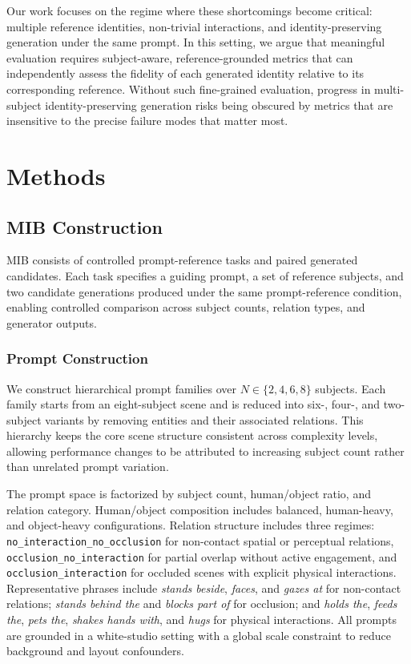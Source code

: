 \documentclass{article}
\begin{document}
Our work focuses on the regime where these shortcomings become critical: multiple reference identities, non-trivial interactions, and identity-preserving generation under the same prompt. In this setting, we argue that meaningful evaluation requires subject-aware, reference-grounded metrics that can independently assess the fidelity of each generated identity relative to its corresponding reference. Without such fine-grained evaluation, progress in multi-subject identity-preserving generation risks being obscured by metrics that are insensitive to the precise failure modes that matter most.

\section{Methods}

\subsection{MIB Construction}

MIB consists of controlled prompt-reference tasks and paired generated candidates. Each task specifies a guiding prompt, a set of reference subjects, and two candidate generations produced under the same prompt-reference condition, enabling controlled comparison across subject counts, relation types, and generator outputs.

\subsubsection{Prompt Construction}
We construct hierarchical prompt families over $N \in \{2,4,6,8\}$ subjects. Each family starts from an eight-subject scene and is reduced into six-, four-, and two-subject variants by removing entities and their associated relations. This hierarchy keeps the core scene structure consistent across complexity levels, allowing performance changes to be attributed to increasing subject count rather than unrelated prompt variation.

The prompt space is factorized by subject count, human/object ratio, and relation category. Human/object composition includes balanced, human-heavy, and object-heavy configurations. Relation structure includes three regimes:
\texttt{no\_interaction\_no\_occlusion} for non-contact spatial or perceptual relations,
\texttt{occlusion\_no\_interaction} for partial overlap without active engagement,
and \texttt{occlusion\_interaction} for occluded scenes with explicit physical interactions.
Representative phrases include \textit{stands beside}, \textit{faces}, and \textit{gazes at} for non-contact relations;
\textit{stands behind the} and \textit{blocks part of} for occlusion;
and \textit{holds the}, \textit{feeds the}, \textit{pets the}, \textit{shakes hands with}, and \textit{hugs} for physical interactions. All prompts are grounded in a white-studio setting with a global scale constraint to reduce background and layout confounders.
\end{document}

